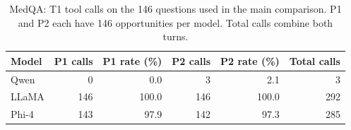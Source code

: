 \begin{table}[!ht]
\centering
\small
\caption{MedQA: T1 tool calls on the 146 questions used
in the main comparison. P1 and P2 each have 146 opportunities
per model. Total calls combine both turns.}
\label{tab:medqa-tool-calls}

\begin{tabular}{@{}lrrrrr@{}}
\toprule
Model & P1 calls & P1 rate (\%)
      & P2 calls & P2 rate (\%) & Total calls \\
\midrule
Qwen  & 0   & 0.0   & 3   & 2.1   & 3   \\
LLaMA & 146 & 100.0 & 146 & 100.0 & 292 \\
Phi-4 & 143 & 97.9  & 142 & 97.3  & 285 \\
\bottomrule
\end{tabular}
\end{table}
